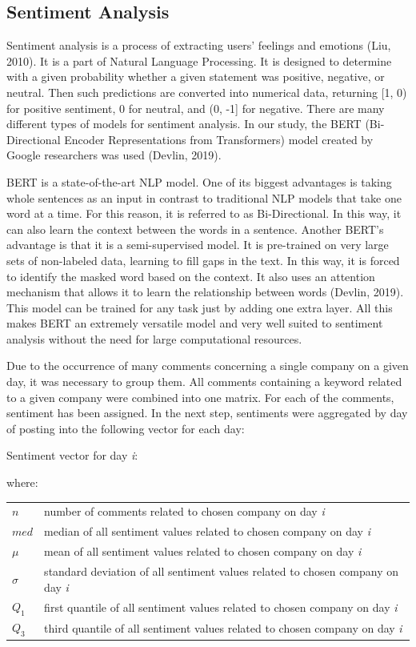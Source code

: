 \documentclass[11pt]{article} %
\makeatletter
\newenvironment{conditions}
  {\par\vspace{\abovedisplayskip}\noindent\begin{tabular}{>{$}l<{$} @{${}={}$} l}}
  {\end{tabular}\par\vspace{\belowdisplayskip}}
\makeatother
\begin{document}
\subsection{Sentiment Analysis}
Sentiment analysis is a process of extracting users' feelings and emotions (Liu, 2010). It is a part of Natural Language Processing. It is designed to determine with a given probability whether a given statement was positive, negative, or neutral. Then such predictions are converted into numerical data, returning [1, 0) for positive sentiment, 0 for neutral, and (0, -1] for negative. There are many different types of models for sentiment analysis. In our study, the BERT (Bi-Directional Encoder Representations from Transformers) model created by Google researchers was used (Devlin, 2019). 

BERT is a state-of-the-art NLP model. One of its biggest advantages is taking whole sentences as an input in contrast to traditional NLP models that take one word at a time. For this reason, it is referred to as Bi-Directional. In this way, it can also learn the context between the words in a sentence. Another BERT's advantage is that it is a semi-supervised model. It is pre-trained on very large sets of non-labeled data, learning to fill gaps in the text. In this way, it is forced to identify the masked word based on the context. It also uses an attention mechanism that allows it to learn the relationship between words (Devlin, 2019). This model can be trained for any task just by adding one extra layer.  All this makes BERT an extremely versatile model and very well suited to sentiment analysis without the need for large computational resources. 


Due to the occurrence of many comments concerning a single company on a given day, it was necessary to group them. All comments containing a keyword related to a given company were combined into one matrix. For each of the comments, sentiment has been assigned. In the next step, sentiments were aggregated by day of posting into the following vector for each day: 
\begin{center}   Sentiment vector for day \emph{i}:\end{center}
\begin{equation} [n, \mu, \sigma, med, Q_1, Q_3] \end{equation}
where:
\begin{conditions}
 n     &  number of comments related to chosen company on day \emph{i}\\
 med     &  median of all sentiment values related to chosen company on day \emph{i} \\  
\mu    &  mean of all sentiment values related to chosen company on day \emph{i} \\    
\sigma    &  standard deviation of all sentiment values related to chosen company on day \emph{i} \\   
Q_1     &  first quantile of all sentiment values related to chosen company on day \emph{i} \\   
Q_3     &  third quantile of all sentiment values related to chosen company on day \emph{i} \\   
\end{conditions}
\end{document}
